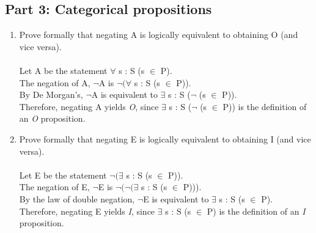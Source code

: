 \subsection{Part 3: Categorical propositions}
\begin{enumerate}
    \item Prove formally that negating A is logically equivalent to obtaining O (and vice versa).\\ \\
Let A be the statement $\forall$ s : S \mid (s $\in$ P).\\
The negation of A, $\neg$A is $\neg(\forall$ s : S \mid (s $\in$ P)).\\
By De Morgan's, $\neg$A is equivalent to $\exists$ s : S \mid ($\neg$ (s $\in$ P)).\\
Therefore, negating A yields \textit{O}, since $\exists$ s : S \mid ($\neg$ (s $\in$ P)) is the definition of an \textit{O} proposition.

    \item Prove formally that negating E is logically equivalent to obtaining I (and vice versa).\\ \\
Let E be the statement $\neg(\exists$ s : S (s $\in$ P)).\\
The negation of E, $\neg$E is $\neg(\neg(\exists$ s : S (s $\in$ P))).\\
By the law of double negation, $\neg$E is equivalent to $\exists$ s : S (s $\in$ P).\\
Therefore, negating E yields \textit{I}, since $\exists$ s : S (s $\in$ P) is the definition of an \textit{I} proposition.


\end{enumerate}
